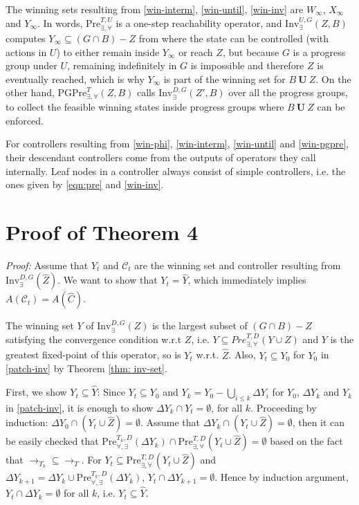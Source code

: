 The winning sets {\color{black} resulting from} \eqref{win-interm}, \eqref{win-until}, \eqref{win-inv} are $ W_{\infty} $, $ X_{\infty} $ and $ Y_{\infty} $. {\color{black} In words, $\text{Pre}_{\exists,\forall}^{T,U}$ is a one-step reachability operator, and $\text{Inv}_{\exists}^{U,G}(Z,B)$ computes $Y_\infty \subseteq (G\cap B) - Z$ from where the state can be controlled (with actions in $U$) to either remain inside $Y_\infty$ or reach $Z$, but because $G$ is a progress group under $U$, remaining indefinitely in $G$ is impossible and therefore $Z$ is eventually reached, which is why $Y_\infty$ is part of the winning set for $B\mathbf{\ U\ }Z$.} On the other hand, $ \text{PGPre}_{\exists,\forall}^T(Z,B) $ calls $ \text{Inv}_{\exists}^{D,G}(Z',B) $ over all the progress groups, to collect the feasible winning states inside progress groups where $ B\ \mathbf{U}\ Z $ can be enforced.
    
For controllers resulting from \eqref{win-phi}, \eqref{win-interm}, \eqref{win-until} and \eqref{win-pgpre}, their descendant controllers come from the outputs of operators they call internally. Leaf nodes in a controller always consist of simple controllers, i.e. the ones given by \eqref{eqn:pre} and \eqref{win-inv}. 

\section{Proof of Theorem 4}\label{app:pr-31}


\emph{Proof:} Assume that $ Y_t $ and $ \mathcal{C}_t $ are the winning set and controller resulting from $ \text{Inv}_{\exists}^{D,G} (\widehat{Z}) $. We want to show that $ Y_t=\widehat{Y}$, which immediately implies $ A(\mathcal{C}_t) = A(\widehat{C}) $.
	
The winning set $ Y $ of $ \text{Inv}_{\exists}^{D,G} (Z) $ is the largest subset of $ (G\cap B) - Z  $ satisfying the convergence condition w.r.t $ Z $, i.e. $ Y \subseteq Pre^{T,D}_{\exists, \forall}(Y\cup Z) $ and $Y$ is the greatest fixed-point of this operator, so is $ Y_t $ w.r.t. $ \widehat{Z} $. Also, $ Y_t \subseteq Y_0 $ for $ Y_0 $ in \eqref{patch-inv} by Theorem \ref{thm: inv-set}. 
	
	First, we show $ Y_t \subseteq \widehat{Y} $: Since $ Y_t\subseteq Y_0 $ and $ Y_k = Y_0 - \bigcup_{i\leq k} \Delta Y_i$ for $ Y_0 $, $ \Delta Y_k $ and $ Y_k $ in \eqref{patch-inv}, it is enough to show $ \Delta Y_k\cap Y_t = \emptyset $, for all $ k $. Proceeding by induction: $ \Delta Y_0\cap (Y_t\cup \widehat{Z}) = \emptyset $. Assume that $ \Delta Y_k \cap (Y_t\cup \widehat{Z}) = \emptyset $, then it can be easily checked that $\text{Pre}_{\forall, \exists}^{T_k,D}(\Delta Y_k) \cap  \text{Pre}_{\exists,\forall}^{T,D} (Y_t\cup \widehat{Z}) = \emptyset$ based on the fact that	 $ \rightarrow_{T_k}\subseteq \rightarrow_{T} $. For $ Y_t \subseteq \text{Pre}_{\exists,\forall}^{T,D} (Y_t\cup \widehat{Z}) $ and $ \Delta Y_{k+1} = \Delta Y_k\cup \text{Pre}_{\forall, \exists}^{T_k,D}(\Delta Y_k) $, $ Y_t\cap \Delta Y_{k+1} = \emptyset $. Hence by induction argument, $ Y_t \cap \Delta Y_k = \emptyset$  for all $ k $, i.e. $ Y_t\subseteq \widehat{Y} $. 
	

